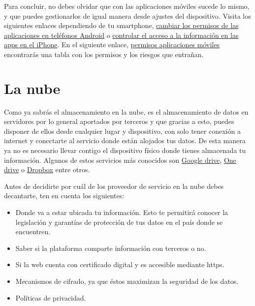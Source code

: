 \documentclass[
  a4paper,
  openany]{book}
\begin{document}
Para concluir, no debes olvidar que con las aplicaciones móviles sucede lo mismo, y que puedes gestionarlos de igual manera desde ajustes del dispositivo. Visita los siguientes enlaces dependiendo de tu smartphone, \href{https://support.google.com/android/answer/9431959?hl=es}{cambiar los permisos de las aplicaciones en teléfonos Android} o \href{https://support.apple.com/es-es/guide/iphone/iph251e92810/ios}{controlar el acceso a la información en las apps en el iPhone}. En el siguiente enlace, \href{https://www.osi.es/sites/default/files/docs/c5-eg-permisos-apps-riesgos.pdf}{permisos aplicaciones móviles} encontrarás una tabla con los permisos y los riesgos que entrañan.

\hypertarget{la-nube}{%
\section{La nube}\label{la-nube}}

Como ya sabrás el almacenamiento en la nube, es el almacenamiento de datos en servidores por lo general aportados por terceros y que gracias a esto, puedes disponer de ellos desde cualquier lugar y dispositivo, con solo tener conexión a internet y conectarte al servicio donde están alojados tus datos. De esta manera ya no es necesario llevar contigo el dispositivo físico donde tienes almacenada tu información. Algunos de estos servicios más conocidos son \href{https://www.google.com/intl/en_in/drive/}{Google drive}, \href{https://www.microsoft.com/en-us/microsoft-365/onedrive/online-cloud-storage}{One drive} o \href{https://www.dropbox.com/}{Dropbox} entre otros.

Antes de decidirte por cuál de los proveedor de servicio en la nube debes decantarte, ten en cuenta los siguientes:

\begin{itemize}
\item
  Donde va a estar ubicada tu información. Esto te permitirá conocer la legislación y
  garantías de protección de tus datos en el país donde se encuentren.
\item
  Saber si la plataforma comparte información con terceros o no.
\item
  Si la web cuenta con certificado digital y es accesible mediante https.
\item
  Mecanismos de cifrado, ya que éstos maximizan la seguridad de los datos.
\item
  Políticas de privacidad.
\end{itemize}
\end{document}
